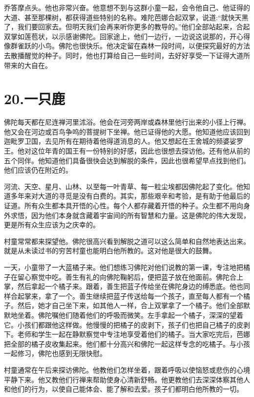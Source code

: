 \documentclass[12pt,twoside,openany]{book}
\begin{document}
乔答摩点头。他也非常兴奋。他意想不到与这群小童一起，会令他自己、他证得的大道、甚至那棵树，都获得道些特别的名称。难陀芭娜合起双掌，说道:“就快天黑了，我们要回家去。但明天我们会再来听你更多的教导的。”他们全部站起来，合起双掌如莲苞状，以示感谢佛陀。回家途上，他们一边行，一边说这说那的，开心得像群雀跃的小鸟。佛陀也很快乐。他决定留在森林一段时间，以便探究最好的方法去散播醒觉的种子。同时，他也打算给自己一些时间，去好好享受一下证得大道所带来的大自在。


\chapter{20.一只鹿}\label{ch20}

佛陀每天都在尼连禅河里沭浴。他会在河旁两岸或森林里他行出来的小径上行禅。他又会在河边或百鸟争呜的菩提树下坐禅。他已证得他的大愿。他知道他应该回到迦毗罗卫国，去见所有在期待着他得道消息的人。他又想起在王舍城的频婆娑罗王。他对这位年青的国王有一份特别的好感，因此也很想去探访他。还有他从前的五个同伴。他知道他们具备很快会达到解脱的条件，因此也很希望早点找到他们。他们应该仍在附近的。

河流、天空、星月、山林、以至每一叶青草、每一粒尘埃都因佛陀起了变化。他知道多年来对大道的寻觅是没有白费的。其实，那些艰辛和考验，是有助于他最后的证道。所有众生都本具开悟的心性。每个人都存藏着开悟的种子。众生都不用向身外求悟，因为他们本身就含藏着宇宙间的所有智慧和力量。这是佛陀的伟大发现，更是所有众生应该为之庆幸的。

村童常常都来探望他。佛陀很高兴看到解脱之道可以这么简单和自然地表达出来。就是从未读过书的穷苦村童也能明白他所教的。这对他是很大的鼓舞。

一天，小童带了一大蓝橘子来。他们想练习佛陀对他们说教的第一课，专注地把橘子在留心察觉中吃。善生有礼的向佛陀鞠躬后，便把蓝子放在他面前。佛陀合上掌，然后拿起一个橘子来。跟着，善生把蓝子传给坐在佛陀身边的缚悉底。他也同样合起掌来，拿了一个。善生继续把蓝子传送给每一个孩子，直至每人都有一个橘子。然后，她才自己坐下来，如其他人一样，合上双掌拿了一个橘子。他们全部默默地坐着。佛陀嘱他们随着他们的呼吸而微笑。左手拿起一个橘子，深深的望着它。小孩们都跟他这样做。他慢慢的把橘子的皮剥下，孩子们也把自己橘子的皮剥下。老师和学生一起在静默察觉中专注地享受着他们的橘子。当大家吃完后，芭娜把全部的橘子皮收集起来。他们都十分高兴和佛陀一起这样专念的吃橘子。与小孩一起修习，佛陀也感到无限快慰。

村童通常在午后来探访佛陀。他教他们怎样坐着，跟着呼吸以使恼怒或悲伤的心境平静下来。他又教他们行禅来帮助使身心清新舒畅。他更教他们去深深体察其他人和他们的行为，以使自己能体会、能了解和去爱。孩子们都明白他所教的一切。
\end{document}
